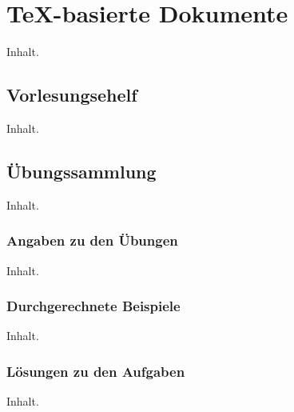 \chapter{TeX-basierte Dokumente}
Inhalt.

\section{Vorlesungsehelf}
Inhalt.

\section{\"{U}bungssammlung}
Inhalt.

\subsection{Angaben zu den \"{U}bungen}
Inhalt.

\subsection{Durchgerechnete Beispiele}
Inhalt.

\subsection{L\"{o}sungen zu den Aufgaben}
Inhalt.
